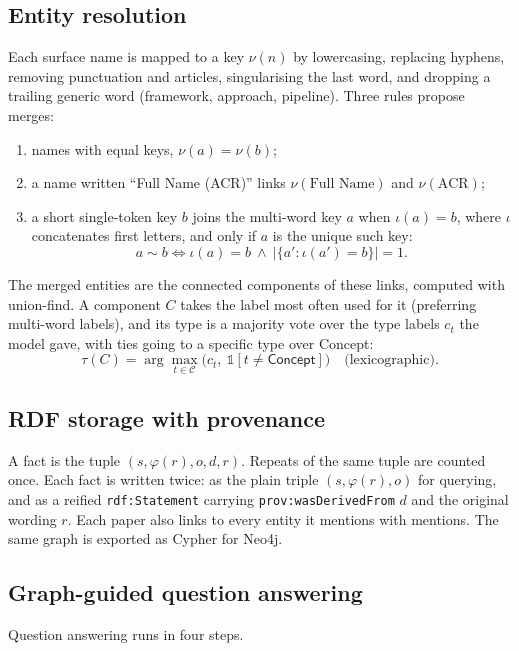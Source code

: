 \documentclass[11pt]{article}
\newcommand{\code}[1]{\texttt{#1}}
\newcommand{\prop}[1]{\textsf{#1}}
\begin{document}
\subsection{Entity resolution}\label{sec:resolve}
Each surface name is mapped to a key $\nu(n)$ by lowercasing, replacing hyphens, removing punctuation and articles, singularising the last word, and dropping a trailing generic word (framework, approach, pipeline). Three rules propose merges:
\begin{enumerate}
  \item names with equal keys, $\nu(a)=\nu(b)$;
  \item a name written ``Full Name (ACR)'' links $\nu(\text{Full Name})$ and $\nu(\text{ACR})$;
  \item a short single-token key $b$ joins the multi-word key $a$ when $\iota(a)=b$, where $\iota$ concatenates first letters, and only if $a$ is the unique such key:
  \begin{equation}
    a \sim b \iff \iota(a) = b \ \wedge\ \big|\{a' : \iota(a') = b\}\big| = 1 .
  \end{equation}
\end{enumerate}
The merged entities are the connected components of these links, computed with union-find. A component $C$ takes the label most often used for it (preferring multi-word labels), and its type is a majority vote over the type labels $c_t$ the model gave, with ties going to a specific type over \textsf{Concept}:
\begin{equation}
  \tau(C) = \arg\max_{t \in \mathcal{C}} \big(c_t,\ \mathbb{1}[t \neq \textsf{Concept}]\big)\quad\text{(lexicographic)}.
\end{equation}

\subsection{RDF storage with provenance}\label{sec:store}
A fact is the tuple $(s,\varphi(r),o,d,r)$. Repeats of the same tuple are counted once. Each fact is written twice: as the plain triple $(s,\varphi(r),o)$ for querying, and as a reified \code{rdf:Statement} carrying \code{prov:wasDerivedFrom} $d$ and the original wording $r$. Each paper also links to every entity it mentions with \prop{mentions}. The same graph is exported as Cypher for Neo4j.

\subsection{Graph-guided question answering}\label{sec:qa}
Question answering runs in four steps.
\end{document}
